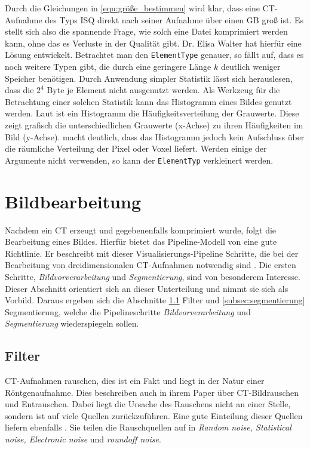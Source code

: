 Durch die Gleichungen in \ref{equ:größe_bestimmen} wird klar, dass eine \ac{CT}-Aufnahme
des Typs \ac{ISQ} direkt nach seiner Aufnahme über einen \ac{GB} groß ist. Es stellt
sich also die spannende Frage, wie solch eine Datei komprimiert werden kann, ohne
das es Verluste in der Qualität gibt. Dr. Elisa Walter hat hierfür eine Lösung entwickelt.
Betrachtet man den \texttt{ElementType} genauer, so fällt auf, dass es noch weitere
Typen gibt, die durch eine geringere Länge $k$ deutlich weniger Speicher
benötigen. Durch Anwendung simpler Statistik lässt sich herauslesen, dass die
$2^{4}$ Byte je Element nicht ausgenutzt werden. Als Werkzeug für die Betrachtung
einer solchen Statistik kann das Histogramm eines Bildes genutzt werden. Laut
\citet[S.~249]{jahne2024} ist ein Histogramm die Häufigkeitsverteilung der Grauwerte.
Diese zeigt grafisch die unterschiedlichen Grauwerte (x-Achse) zu ihren
Häufigkeiten im Bild (y-Achse). \citet[S.~249]{jahne2024} macht deutlich, dass das
Histogramm jedoch kein Aufschluss über die räumliche Verteilung der Pixel oder Voxel
liefert. Werden einige der Argumente nicht verwenden, so kann der \texttt{ElementTyp}
verkleinert werden.

\section{Bildbearbeitung}
\label{sec:bildbearbeitung} Nachdem ein \ac{CT} erzeugt und gegebenenfalls komprimiert
wurde, folgt die Bearbeitung eines Bildes. Hierfür bietet das Pipeline-Modell von
\citet[S.~50]{handels2000} eine gute Richtlinie. Er beschreibt mit dieser Visualisierungs-Pipeline
Schritte, die bei der Bearbeitung von dreidimensionalen \ac{CT}-Aufnahmen notwendig
sind \citep[vgl.][S.~50]{handels2000}. Die ersten Schritte, \textit{Bildvorverarbeitung}
und \textit{Segmentierung}, sind von besonderem Interesse. Dieser Abschnitt
orientiert sich an dieser Unterteilung und nimmt sie sich als Vorbild. Daraus ergeben
sich die Abschnitte \ref{subsec:filter} Filter und \ref{subsec:segmentierung} Segmentierung,
welche die Pipelineschritte \textit{Bildvorverarbeitung} und \textit{Segmentierung}
wiederspiegeln sollen.

\subsection{Filter}
\label{subsec:filter} \ac{CT}-Aufnahmen rauschen, dies ist ein Fakt und liegt in
der Natur einer Röntgenaufnahme. Dies beschreiben auch \citet[K.~3]{diwakar2018}
in ihrem Paper über \ac{CT}-Bildrauschen und Entrauschen. Dabei liegt die
Ursache des Rauschens nicht an einer Stelle, sondern ist auf viele Quellen zurückzuführen.
Eine gute Einteilung dieser Quellen liefern ebenfalls \citet[K.~3]{diwakar2018}.
Sie teilen die Rauschquellen auf in \textit{Random noise, Statistical noise,
Electronic noise} und \textit{roundoff noise}.

